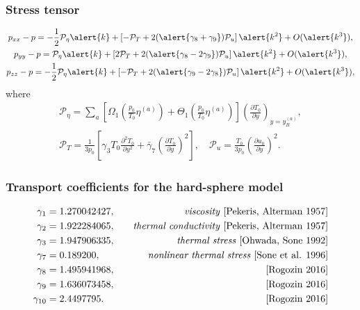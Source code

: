 \documentclass[mathserif]{beamer} %
\newcommand{\pder}[2][]{\frac{\partial#1}{\partial#2}}
\newcommand{\pderdual}[2][]{\frac{\partial^2#1}{\partial#2^2}}
\newcommand{\OO}[1]{O(#1)}
\begin{document}
\begin{frame}
    \frametitle{Stress tensor}
    \begin{gather}
        p_{xx} - p = -\frac12\mathcal{P}_\eta \alert{k}
            + \left[-\mathcal{P}_T + 2(\alert{\gamma_8+\gamma_9})\mathcal{P}_u\right]\alert{k^2}
            + \OO{\alert{k^3}}, \label{eq:Hilbert_Pxx}\\
        p_{yy} - p = \mathcal{P}_\eta \alert{k}
            + \left[2\mathcal{P}_T + 2(\alert{\gamma_8-2\gamma_9})\mathcal{P}_u\right]\alert{k^2}
            + \OO{\alert{k^3}}, \label{eq:Hilbert_Pyy}\\
        p_{zz} - p = -\frac12\mathcal{P}_\eta \alert{k}
            + \left[-\mathcal{P}_T + 2(\alert{\gamma_9-2\gamma_8})\mathcal{P}_u\right]\alert{k^2}
            + \OO{\alert{k^3}}, \label{eq:Hilbert_Pzz}
    \end{gather}
    where
    \begin{gather}\label{eq:mathcal_P_def}
        \mathcal{P}_\eta = \sum_a \left[\Omega_1\left(\frac{p_0}{T_0}\eta^{(a)}\right)
            + \Theta_1\left(\frac{p_0}{T_0}\eta^{(a)}\right)\right]\left(\pder[T_0]{y}\right)_{y=y_B^{(a)}}, \\
        \mathcal{P}_T = \frac1{3p_0}\left[\gamma_3 T_0 \pderdual[T_0]{y} + \bar{\gamma}_7\left(\pder[T_0]{y}\right)^2\right], \quad
        \mathcal{P}_u = \frac{T_0}{3p_0}\left(\pder[u_0]{y}\right)^2.
    \end{gather}
\end{frame}

\begin{frame}
    \frametitle{Transport coefficients for the hard-sphere model}
    \begin{alignat*}{2}
        \gamma_1 &= 1.270042427, \quad &\text{\emph{viscosity} [Pekeris, Alterman 1957]} \\
        \gamma_2 &= 1.922284065, \quad &\text{\emph{thermal conductivity} [Pekeris, Alterman 1957]} \\
        \gamma_3 &= 1.947906335, \quad &\text{\emph{thermal stress} [Ohwada, Sone 1992]} \\
        \gamma_7 &= 0.189200,    \quad &\text{\emph{nonlinear thermal stress} [Sone et al. 1996]} \\
        \gamma_8 &= 1.495941968, \quad &\text{[Rogozin 2016]} \\
        \gamma_9 &= 1.636073458, \quad &\text{[Rogozin 2016]} \\
        \gamma_{10} &= 2.4497795.\quad &\text{[Rogozin 2016]}
    \end{alignat*}
\end{frame}
\end{document}
